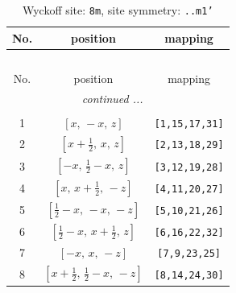 \documentclass[fleqn,8pt]{jsarticle}
\begin{document}
\begin{longtable}{ccc}
\caption{Wyckoff site: {\tt 8m}, site symmetry: {\tt ..m1'}}
 \\
 \hline \hline
No. & position & mapping \\ \hline \endfirsthead

\multicolumn{2}{l}{\tablename\ \thetable{}} \\
 \hline \hline
No. & position & mapping \\ \hline \endhead

 \hline \hline
\multicolumn{2}{r}{\footnotesize\it continued ...} \\ \endfoot

 \hline \hline
\multicolumn{2}{r}{} \\ \endlastfoot

1 & $\left[ x,\, - x,\, z \right]$ & {\tt [1,15,17,31]} \\ \hline
2 & $\left[ x + \frac{1}{2},\, x,\, z \right]$ & {\tt [2,13,18,29]} \\ \hline
3 & $\left[ - x,\, \frac{1}{2} - x,\, z \right]$ & {\tt [3,12,19,28]} \\ \hline
4 & $\left[ x,\, x + \frac{1}{2},\, - z \right]$ & {\tt [4,11,20,27]} \\ \hline
5 & $\left[ \frac{1}{2} - x,\, - x,\, - z \right]$ & {\tt [5,10,21,26]} \\ \hline
6 & $\left[ \frac{1}{2} - x,\, x + \frac{1}{2},\, z \right]$ & {\tt [6,16,22,32]} \\ \hline
7 & $\left[ - x,\, x,\, - z \right]$ & {\tt [7,9,23,25]} \\ \hline
8 & $\left[ x + \frac{1}{2},\, \frac{1}{2} - x,\, - z \right]$ & {\tt [8,14,24,30]} \\
\end{longtable}
\renewcommand{\arraystretch}{1.2}
\end{document}
